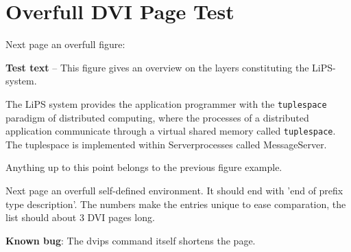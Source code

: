 \section{Overfull DVI Page Test}

Next page an overfull figure:

\clearpage
{}
{{\bf Test text} --
This figure gives an overview on the layers constituting the LiPS-system.

The LiPS system provides the application programmer with the 
{\tt tuplespace} paradigm of distributed 
computing, where the processes of a distributed application communicate
through a virtual shared memory called {\tt tuplespace}.
The tuplespace is implemented within Serverprocesses called MessageServer.
}
\clearpage
Anything up to this point belongs to the previous figure example.


Next page an overfull self-defined environment. It should end with
'end of prefix type description'. The numbers make the entries unique
to ease comparation, the list should about 3 DVI pages long.

{\bf Known bug}: The dvips command itself shortens the page.

\clearpage
\def\mylist{\small\bf\tt}

